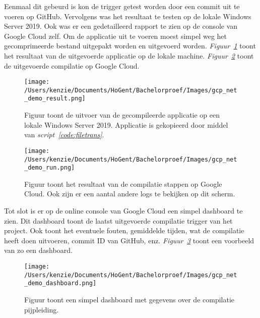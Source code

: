 Eenmaal dit gebeurd is kon de trigger getest worden door een commit uit te voeren op GitHub. Vervolgens was het resultaat te testen op de lokale Windows Server 2019. Ook was er een gedetailleerd rapport te zien op de console van Google Cloud zelf. Om de applicatie uit te voeren moest simpel weg het gecomprimeerde bestand uitgepakt worden en uitgevoerd worden. \emph{Figuur~\ref{fig:GCP_POC_result}} toont het resultaat van de uitgevoerde applicatie op de lokale machine. \emph{Figuur~\ref{fig:GCP_POC_run}} toont de uitgevoerde compilatie op Google Cloud.

\begin{figure}[!htbp]
    \centering
    \texttt{[image: /Users/kenzie/Documents/HoGent/Bachelorproef/Images/gcp\_net\_demo\_result.png]}
    \caption{Figuur toont de uitvoer van de gecompileerde applicatie op een lokale Windows Server 2019. Applicatie is gekopieerd door middel van \emph{script~\ref{code:filetrans}}.}
    \label{fig:GCP_POC_result}
\end{figure}

\begin{figure}[!htbp]
    \centering
    \texttt{[image: /Users/kenzie/Documents/HoGent/Bachelorproef/Images/gcp\_net\_demo\_run.png]}
    \caption{Figuur toont het resultaat van de compilatie stappen op Google Cloud. Ook zijn er een aantal andere logs te bekijken op dit scherm.}
    \label{fig:GCP_POC_run}
\end{figure}

Tot slot is er op de online console van Google Cloud een simpel dashboard te zien. Dit dashboard toont de laatst uitgevoerde compilatie trigger van het project. Ook toont het eventuele fouten, gemiddelde tijden, wat de compilatie heeft doen uitvoeren, commit ID van GitHub, enz. \emph{Figuur~\ref{fig:GCP_POC_dashboard}} toont een voorbeeld van zo een dashboard.

\begin{figure}[!htbp]
    \centering
    \texttt{[image: /Users/kenzie/Documents/HoGent/Bachelorproef/Images/gcp\_net\_demo\_dashboard.png]}
    \caption{Figuur toont een simpel dashboard met gegevens over de compilatie pijpleiding.}
    \label{fig:GCP_POC_dashboard}
\end{figure}

